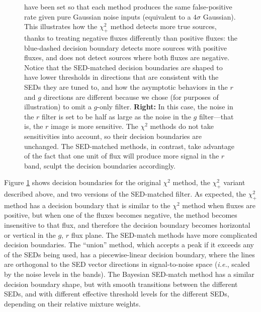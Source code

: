 \documentclass[11pt,letterpaper,linenumbers]{aastex63}
\newcommand{\latin}[1]{\emph{#1}}
\newcommand{\ie}{\latin{i.e.}}
\newcommand{\chipos}{\chi_+}
\begin{document}
\begin{figure}
{    have been set so that each method produces the same false-positive
    rate given pure Gaussian noise inputs (equivalent to a $4 \sigma$
    Gaussian).  This illustrates how the $\chipos^2$ method detects
    more true sources, thanks to treating negative fluxes differently
    than positive fluxes: the blue-dashed decision boundary detects
    more sources with positive fluxes, and does not detect sources
    where both fluxes are negative.  Notice that the SED-matched
    decision boundaries are shaped to have lower thresholds in
    directions that are consistent with the SEDs they are tuned to,
    and how the asymptotic behaviors in the $r$ and $g$ directions are
    different because we chose (for purposes of illustration) to omit
    a $g$-only filter.  \textbf{Right:} In this case, the noise in the
    $r$ filter is set to be half as large as the noise in the $g$
    filter---that is, the $r$ image is more sensitive.  The $\chi^2$
    methods do not take sensitivities into account, so their decision
    boundaries are unchanged.  The SED-matched methods, in contrast,
    take advantage of the fact that one unit of flux will produce more
    signal in the $r$ band, sculpt the decision boundaries
    accordingly.
  \label{fig:chipos_boundary}}
\end{figure}

Figure \ref{fig:chipos_boundary} shows decision boundaries for the
original $\chi^2$ method, the $\chipos^2$ variant described above, and
two versions of the SED-matched filter.  As expected, the $\chipos^2$
method has a decision boundary that is similar to the $\chi^2$ method
when fluxes are positive, but when one of the fluxes becomes negative,
the method becomes insensitive to that flux, and therefore the
decision boundary becomes horizontal or vertical in the $g$, $r$ flux
plane.  The SED-match methods have more complicated decision
boundaries.  The ``union'' method, which accepts a peak if it exceeds
any of the SEDs being used, has a piecewise-linear decision boundary,
where the lines are orthogonal to the SED vector directions in
signal-to-noise space (\ie, scaled by the noise levels in the bands).
The Bayesian SED-match method has a similar decision boundary shape,
but with smooth transitions between the different SEDs, and with
different effective threshold levels for the different SEDs, depending
on their relative mixture weights.
\end{document}
